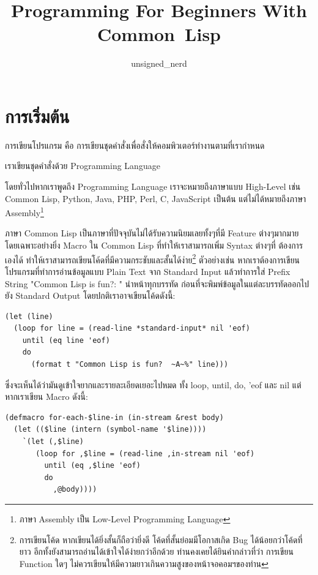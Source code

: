 \documentclass[a4paper]{article}
\begin{document}
\title{Programming For Beginners With Common~Lisp}
\author{unsigned\_nerd}
\maketitle

\tableofcontents

\section{การเริ่มต้น}

การเขียนโปรแกรม คือ การเขียนชุดคำสั่งเพื่อสั่งให้คอมพิวเตอร์ทำงานตามที่เรากำหนด

เราเขียนชุดคำสั่งด้วย Programming Language

โดยทั่วไปหากเราพูดถึง Programming Language เราจะหมายถึงภาษาแบบ High-Level เช่น
Common Lisp, Python, Java, PHP, Perl, C, JavaScript เป็นต้น
แต่ไม่ได้หมายถึงภาษา Assembly\footnote{ภาษา Assembly เป็น Low-Level
Programming Language}

ภาษา Common Lisp เป็นภาษาที่ปัจจุบันไม่ได้รับความนิยมเลยทั้งๆที่มี Feature ต่างๆมากมาย 
โดยเฉพาะอย่างยิ่ง Macro ใน Common Lisp ที่ทำให้เราสามารถเพิ่ม Syntax ต่างๆที่%
ต้องการเองได้ ทำให้เราสามารถเขียนโค้ดที่มีความกระชับและสั้นได้ง่าย\footnote{การเขียนโค้ด
หากเขียนได้ยิ่งสั้นก็ถือว่ายิ่งดี โค้ดที่สั้นย่อมมีโอกาสเกิด Bug ได้น้อยกว่าโค้ดที่ยาว
อีกทั้งยังสามารถอ่านได้เข้าใจได้ง่ายกว่าอีกด้วย ท่านคงเคยได้ยินคำกล่าวที่ว่า การเขียน
Function ใดๆ ไม่ควรเขียนให้มีความยาวเกินความสูงของหน้าจอคอมฯของท่าน} ตัวอย่างเช่น
หากเราต้องการเขียนโปรแกรมที่ทำการอ่านข้อมูลแบบ Plain Text จาก Standard Input
แล้วทำการใส่ Prefix String "Common Lisp is fun?: " นำหน้าทุกบรรทัด
ก่อนที่จะพิมพ์ข้อมูลในแต่ละบรรทัดออกไปยัง Standard Output โดยปกติเราอาจเขียนโค้ดดังนี้:

\lstset{language=Lisp}
\begin{lstlisting}
(let (line)
  (loop for line = (read-line *standard-input* nil 'eof)
    until (eq line 'eof)
    do
      (format t "Common Lisp is fun?  ~A~%" line)))
\end{lstlisting}

ซึ่งจะเห็นได้ว่ามันดูเข้าใจยากและรายละเอียดเยอะไปหมด ทั้ง loop, until, do, 'eof และ
nil แต่หากเราเขียน Macro ดังนี้:

\lstset{language=Lisp}
\begin{lstlisting}
(defmacro for-each-$line-in (in-stream &rest body)
  (let (($line (intern (symbol-name '$line))))
    `(let (,$line)
       (loop for ,$line = (read-line ,in-stream nil 'eof)
         until (eq ,$line 'eof)
         do
           ,@body))))
\end{lstlisting}
\end{document}
